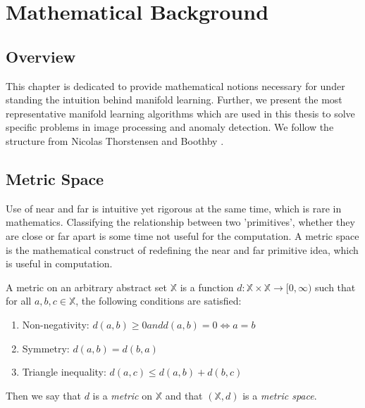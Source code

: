 \chapter{Mathematical Background } %

\label{Chapter2} %


\section*{Overview}

This chapter is dedicated to provide mathematical notions necessary for under
standing the intuition behind manifold learning. Further, we present the
most representative manifold learning algorithms which are used in this thesis to solve specific problems in image processing and anomaly detection. We follow the structure from  Nicolas Thorstensen \citep{Thor2009} and Boothby \citep{Boot2003}. 
 
\section{Metric Space}
Use of near and far is intuitive yet rigorous at the same time, which is rare in mathematics. Classifying the relationship between two 'primitives', whether they are close or far apart is some time not useful for the computation. A metric space is the mathematical construct of redefining the near and far primitive idea, which is useful in computation.


\begin{definition}

A metric on an arbitrary abstract set $\mathbb{X}$ is a function $d:\mathbb{X}\times \mathbb{X}\to [0,\infty)$ such that for all $a,b,c\in \mathbb{X}$, the following conditions are satisfied:

\begin{enumerate}
\item Non-negativity:	$d(a,b)\geq 0 and d(a,b)=0\Leftrightarrow a=b$
\item Symmetry:	$d(a,b)=d(b,a)$
\item Triangle inequality:  $d(a,c)\leq d(a,b)+d(b,c)$
	
\end{enumerate}

Then we say that $d$ is a \emph{metric} on $\mathbb{X}$ and that $(\mathbb{X},d)$ is a \emph{metric space}.

\end{definition}

